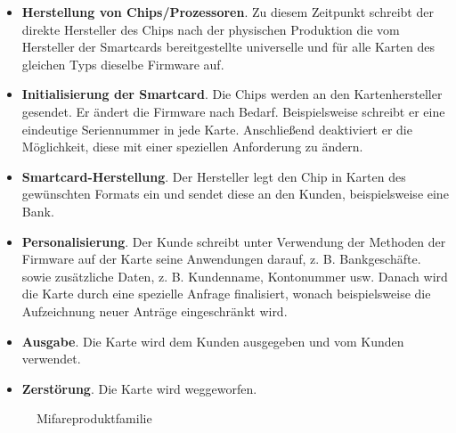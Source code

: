 \begin{itemize}
	\item \textbf{Herstellung von Chips/Prozessoren}. Zu diesem Zeitpunkt schreibt der direkte Hersteller des Chips nach der physischen Produktion die vom Hersteller der Smartcards bereitgestellte universelle und für alle Karten des gleichen Typs dieselbe Firmware auf.
\item \textbf{Initialisierung der Smartcard}. Die Chips werden an den Kartenhersteller gesendet. Er ändert die Firmware nach Bedarf. Beispielsweise schreibt er eine eindeutige Seriennummer in jede Karte. Anschließend deaktiviert er die Möglichkeit, diese mit einer speziellen Anforderung zu ändern.
\item \textbf{Smartcard-Herstellung}. Der Hersteller legt den Chip in Karten des gewünschten Formats ein und sendet diese an den Kunden, beispielsweise eine Bank.
\item \textbf{Personalisierung}. Der Kunde schreibt unter Verwendung der Methoden der Firmware auf der Karte seine Anwendungen darauf, z. B. Bankgeschäfte. sowie zusätzliche Daten, z. B. Kundenname, Kontonummer usw. Danach wird die Karte durch eine spezielle Anfrage finalisiert, wonach beispielsweise die Aufzeichnung neuer Anträge eingeschränkt wird.
\item \textbf{Ausgabe}. Die Karte wird dem Kunden ausgegeben und vom Kunden verwendet.
\item \textbf{Zerstörung}. Die Karte wird weggeworfen.
\end{itemize}

\begin{figure}
	\centering
	\caption{Mifareproduktfamilie}
	\label{fig:mifare}
\end{figure}


